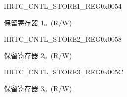 \begin{register}{H}{RTC\_CNTL\_STORE1\_REG}{0x0054}\label{regdesc:RTCCNTLSTORE1REG}
%
\regnewline%
\begin{regdesc}\begin{reglist}
\label{fielddesc:RTCCNTLSCRATCH1}\item [RTC\_CNTL\_SCRATCH1] 保留寄存器 1。(R/W)
\end{reglist}\end{regdesc}
\end{register}


\begin{register}{H}{RTC\_CNTL\_STORE2\_REG}{0x0058}\label{regdesc:RTCCNTLSTORE2REG}
%
\regnewline%
\begin{regdesc}\begin{reglist}
\label{fielddesc:RTCCNTLSCRATCH2}\item [RTC\_CNTL\_SCRATCH2] 保留寄存器 2。(R/W)
\end{reglist}\end{regdesc}
\end{register}


\begin{register}{H}{RTC\_CNTL\_STORE3\_REG}{0x005C}\label{regdesc:RTCCNTLSTORE3REG}
%
\regnewline%
\begin{regdesc}\begin{reglist}
\label{fielddesc:RTCCNTLSCRATCH3}\item [RTC\_CNTL\_SCRATCH3] 保留寄存器 3。(R/W)
\end{reglist}\end{regdesc}
\end{register}


